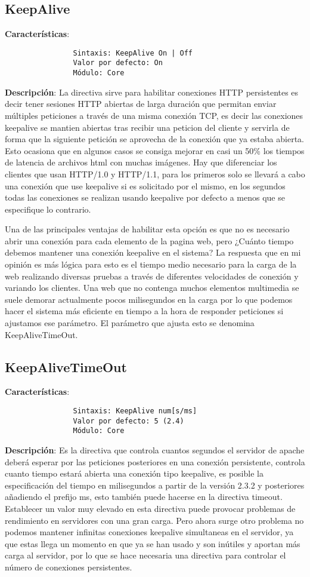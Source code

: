\documentclass[a4paper, 11pt]{article} %
\begin{document}
	\subsection{KeepAlive}
		\textbf{Características}:
		\begin{verbatim}
				Sintaxis: KeepAlive On | Off
				Valor por defecto: On
				Módulo: Core
		\end{verbatim}
		\textbf{Descripción}: La directiva sirve para habilitar conexiones HTTP persistentes es decir tener sesiones HTTP abiertas de larga duración que permitan enviar múltiples peticiones a través de una misma conexión TCP, es decir las conexiones keepalive se mantien abiertas tras recibir una peticion del cliente y servirla de forma que la siguiente petición se aprovecha de la conexión que ya estaba abierta. Esto ocasiona que en algunos casos se consiga mejorar en casi un 50\% los tiempos de latencia de archivos html con muchas imágenes. Hay que diferenciar los clientes que usan HTTP/1.0 y HTTP/1.1, para los primeros solo se llevará a cabo una conexión que use keepalive si es solicitado por el mismo, en los segundos todas las conexiones se realizan usando keepalive por defecto a menos que se especifique lo contrario. 
		
		Una de las principales ventajas de habilitar esta opción es que no es necesario abrir una conexión para cada elemento de la pagina web, pero ¿Cuánto tiempo debemos mantener una conexión keepalive en el sistema? La respuesta que en mi opinión es más lógica para esto es el tiempo medio necesario para la carga de la web realizando diversas pruebas a través de diferentes velocidades de conexión y variando los clientes. Una web que no contenga muchos elementos multimedia se suele demorar actualmente pocos milisegundos en la carga por lo que podemos hacer el sistema más eficiente en tiempo a la hora de responder peticiones si ajustamos ese parámetro. El parámetro que ajusta esto se denomina KeepAliveTimeOut.
	\subsection{KeepAliveTimeOut}
	\textbf{Características}:
	\begin{verbatim}
				Sintaxis: KeepAlive num[s/ms]
				Valor por defecto: 5 (2.4)
				Módulo: Core
	\end{verbatim}
	\textbf{Descripción}: Es la directiva que controla cuantos segundos el servidor de apache deberá esperar por las peticiones posteriores en una conexión persistente, controla cuanto tiempo estará abierta una conexión tipo keepalive, es posible la especificación del tiempo en milisegundos a partir de la versión 2.3.2 y posteriores añadiendo el prefijo ms, esto también puede hacerse en la directiva timeout. Establecer un valor muy elevado en esta directiva puede provocar problemas de rendimiento en servidores con una gran carga. Pero ahora surge otro problema no podemos mantener infinitas conexiones keepalive simultaneas en el servidor, ya que estas llega un momento en que ya se han usado y son inútiles y aportan más carga al servidor, por lo que se hace necesaria una directiva para controlar el número de conexiones persistentes.
\end{document}
